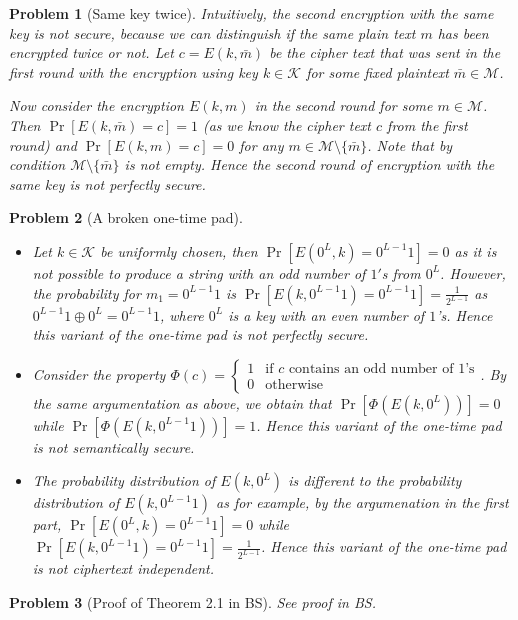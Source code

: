 \documentclass[USenglish,a4paper,12pt]{scrartcl}
\theoremstyle{break}
\newtheorem{exerc}{Problem}
\begin{document}
\begin{exerc}[Same key twice]
    Intuitively, the second encryption with the same key is not secure, because we can distinguish if the same plain text $m$ has been encrypted twice or not. Let $c = E(k,\bar{m})$ be the cipher text that was sent in the first round with the encryption using key $k \in \mathcal{K}$ for some fixed plaintext $\bar{m} \in \mathcal{M}$. 
    
    Now consider the encryption $E(k,m)$ in the second round for some $m \in \mathcal{M}$. Then $\Pr[E(k,\bar{m}) = c] = 1$ (as we know the cipher text $c$ from the first round) and $\Pr[E(k,m) = c] = 0$ for any $m \in \mathcal{M} \setminus \{ \bar{m} \}$. Note that by condition $\mathcal{M} \setminus \{ \bar{m} \}$ is not empty. Hence the second round of encryption with the same key is not perfectly secure.
\end{exerc}



\begin{exerc}[A broken one-time pad]
    \begin{itemize}
        \item Let $k \in \mathcal{K}$ be uniformly chosen, then $\Pr[E(0^L,k) = 0^{L-1}1] = 0$ as it is not possible to produce a string with an odd number of $1'$s from $0^L$. However, the probability for $m_1 = 0^{L-1}1$ is $\Pr[E(k,0^{L-1}1) = 0^{L-1}1] = \frac{1}{2^{L-1}}$ as $0^{L-1}1 \oplus 0^{L} = 0^{L-1}1$, where $0^L$ is a key with an even number of $1$'s. Hence this variant of the one-time pad is not perfectly secure.
        \item Consider the property $\Phi(c) = \begin{cases} 1 & \text{if $c$ contains an odd number of $1$'s}\\ 0 & \text{otherwise}\end{cases}$.
        By the same argumentation as above, we obtain that $\Pr[\Phi(E(k,0^L))] = 0$ while $\Pr[\Phi(E(k,0^{L-1}1))] = 1$. Hence this variant of the one-time pad is not semantically secure.
        \item The probability distribution of $E(k,0^L)$ is different to the probability distribution of $E(k,0^{L-1}1)$ as for example, by the argumenation in the first part, $\Pr[E(0^L,k) = 0^{L-1}1] = 0$ while $\Pr[E(k,0^{L-1}1) = 0^{L-1}1] = \frac{1}{2^{L-1}}$. Hence this variant of the one-time pad is not ciphertext independent.
    \end{itemize}
\end{exerc}


\begin{exerc}[Proof of Theorem 2.1 in BS]
    See proof in BS.
\end{exerc}
\end{document}
